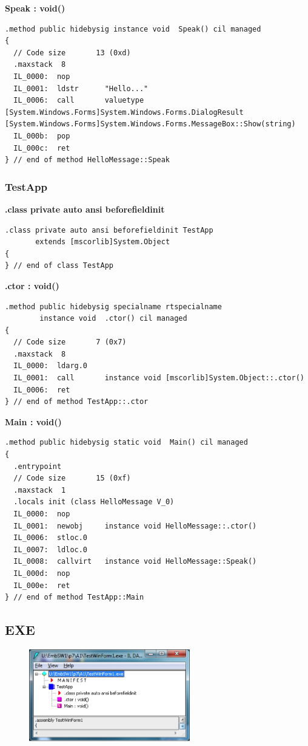 \textbf{Speak : void()}
\begin{lstlisting}[style=Csharp]
.method public hidebysig instance void  Speak() cil managed
{
  // Code size       13 (0xd)
  .maxstack  8
  IL_0000:  nop
  IL_0001:  ldstr      "Hello..."
  IL_0006:  call       valuetype [System.Windows.Forms]System.Windows.Forms.DialogResult [System.Windows.Forms]System.Windows.Forms.MessageBox::Show(string)
  IL_000b:  pop
  IL_000c:  ret
} // end of method HelloMessage::Speak
\end{lstlisting}

\subsubsection{TestApp}
\textbf{.class private auto ansi beforefieldinit}
\begin{lstlisting}[style=Csharp]
.class private auto ansi beforefieldinit TestApp
       extends [mscorlib]System.Object
{
} // end of class TestApp
\end{lstlisting}

\textbf{.ctor : void()}
\begin{lstlisting}[style=Csharp]
.method public hidebysig specialname rtspecialname 
        instance void  .ctor() cil managed
{
  // Code size       7 (0x7)
  .maxstack  8
  IL_0000:  ldarg.0
  IL_0001:  call       instance void [mscorlib]System.Object::.ctor()
  IL_0006:  ret
} // end of method TestApp::.ctor
\end{lstlisting}

\textbf{Main : void()}
\begin{lstlisting}[style=Csharp]
.method public hidebysig static void  Main() cil managed
{
  .entrypoint
  // Code size       15 (0xf)
  .maxstack  1
  .locals init (class HelloMessage V_0)
  IL_0000:  nop
  IL_0001:  newobj     instance void HelloMessage::.ctor()
  IL_0006:  stloc.0
  IL_0007:  ldloc.0
  IL_0008:  callvirt   instance void HelloMessage::Speak()
  IL_000d:  nop
  IL_000e:  ret
} // end of method TestApp::Main
\end{lstlisting}


\subsection{EXE}
\begin{figure}[htbp]
	\centering
	\includegraphics[width=7cm]{images/ILDASM_dll_exe.png}
\end{figure}

